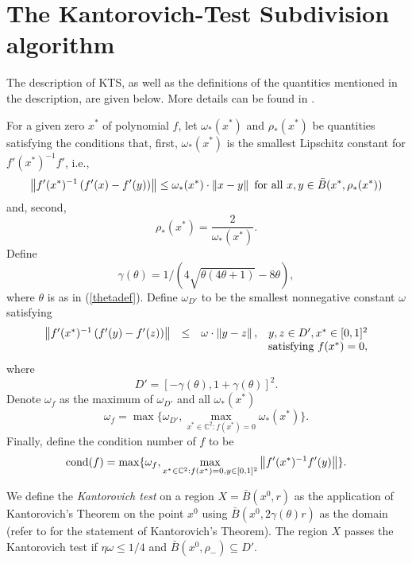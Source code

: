\documentclass[12pt]{article}
\begin{document}
\section{The Kantorovich-Test Subdivision algorithm}

The description of KTS, as well as the definitions of
the quantities mentioned in the description, are given below.
More details can be found in \cite{srijuntongsiri_lsi}.

For a given zero $x^*$ of polynomial $f$,
let $\omega_*(x^*)$ and $\rho_*(x^*)$
be quantities satisfying the conditions that, first, $\omega_*(x^*)$ is the smallest Lipschitz constant
for $f'(x^*)^{-1}f'$, i.e.,
\begin{equation}
\label{lip1}
\left\|f'(x^*)^{-1}\left( f'(x)-f'(y) \right)\right\| \leq \omega_*(x^*) \cdot \left\|x-y\right\| \textrm{ for all } x,y \in \bar{B}(x^*,\rho_*(x^*))
\end{equation}
and, second,
\begin{equation}
\label{rhostar}
\rho_*(x^*) = \frac{2}{\omega_*(x^*)}.
\end{equation}
Define
\[
\gamma(\theta) = 1 / \left(4\sqrt{\theta(4\theta+1)}-8\theta \right),
\]
where $\theta$ is as in (\ref{thetadef}).
Define $\omega_{D'}$ to be
the smallest nonnegative constant $\omega$ satisfying
\begin{equation}
\begin{array}{llll}
\left\|f'(x^*)^{-1}\left(f'(y)-f'(z)\right)\right\| & \leq & \omega \cdot \left\|y-z\right\|, & y,z \in D', x^* \in [0,1]^2
 \\
& & & \textrm{satisfying } f(x^*) = 0,  \label{om}\end{array}
\end{equation}
where
\begin{equation}
\label{dprimedef} D' =
\left[-\gamma(\theta),1+\gamma(\theta)\right]^2.
\end{equation}
Denote $\omega_f$ as the maximum of
$\omega_{D'}$ and all $\omega_*(x^*)$
\[
\omega_f = \max\{\omega_{D'}, \max_{x^* \in \mathbb{C}^2 : f(x^*)=0} \omega_*(x^*)\}.
\]
Finally, define the condition number of $f$ to be
\begin{equation}
\label{conddef}
\mathop{\rm{cond}}(f) = \max \{ \omega_f, \max_{x^* \in \mathbb{C}^2 : f(x^*)=0,y \in [0,1]^2} \left\|f'(x^*)^{-1}f'(y)\right\|\}.
\end{equation}

We define the \emph{Kantorovich test} on a region $X =
\bar{B}(x^0,r)$ as the application of Kantorovich's Theorem on
the point $x^0$ using $\bar{B}(x^0,2\gamma(\theta)r)$ as the
domain (refer to \cite{deuflhard, kantorovich} for the statement of
Kantorovich's Theorem).  The region $X$ passes the Kantorovich
test if $\eta \omega \leq 1/4$ and $\bar{B}(x^0,\rho_-)
\subseteq D'$.
\end{document}
